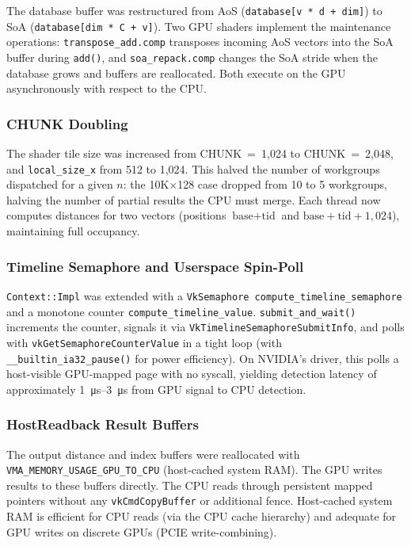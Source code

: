 \documentclass[conference]{IEEEtran}
\begin{document}
The database buffer was restructured from AoS
(\texttt{database[v * d + dim]}) to SoA (\texttt{database[dim * C + v]}).
Two GPU shaders implement the maintenance operations:
\texttt{transpose\_add.comp} transposes incoming AoS vectors into the SoA
buffer during \texttt{add()}, and \texttt{soa\_repack.comp} changes the SoA
stride when the database grows and buffers are reallocated.  Both execute
on the GPU asynchronously with respect to the CPU.

\subsubsection{CHUNK Doubling}

The shader tile size was increased from CHUNK~=~1{,}024 to CHUNK~=~2{,}048,
and \texttt{local\_size\_x} from 512 to 1{,}024.  This halved the number of
workgroups dispatched for a given $n$: the 10K×128 case dropped from 10 to
5 workgroups, halving the number of partial results the CPU must merge.
Each thread now computes distances for two vectors (positions
$\text{base}+\text{tid}$ and $\text{base}+\text{tid}+1{,}024$), maintaining
full occupancy.

\subsubsection{Timeline Semaphore and Userspace Spin-Poll}

\texttt{Context::Impl} was extended with a \texttt{VkSemaphore
compute\_timeline\_semaphore} and a monotone counter
\texttt{compute\_timeline\_value}.  \texttt{submit\_and\_wait()} increments
the counter, signals it via \texttt{VkTimelineSemaphoreSubmitInfo}, and
polls with \texttt{vkGetSemaphoreCounterValue} in a tight loop (with
\texttt{\_\_builtin\_ia32\_pause()} for power efficiency).  On NVIDIA's
driver, this polls a host-visible GPU-mapped page with no syscall, yielding
detection latency of approximately \SI{1}{\micro\second}--\SI{3}{\micro\second}
from GPU signal to CPU detection.

\subsubsection{HostReadback Result Buffers}

The output distance and index buffers were reallocated with
\texttt{VMA\_MEMORY\_USAGE\_GPU\_TO\_CPU} (host-cached system RAM).  The GPU
writes results to these buffers directly.  The CPU reads through persistent
mapped pointers without any \texttt{vkCmdCopyBuffer} or additional fence.
Host-cached system RAM is efficient for CPU reads (via the CPU cache hierarchy)
and adequate for GPU writes on discrete GPUs (PCIE write-combining).
\end{document}
